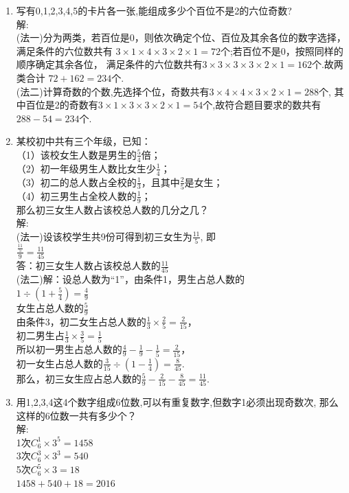 \documentclass[12pt,oneside,a4paper]{ctexbook} %
\numberwithin{chapter}{part}
\begin{document}
\begin{enumerate}
\item 
写有0,1,2,3,4,5的卡片各一张,能组成多少个百位不是2的六位奇数?\\
解:\\
(法一)分为两类，若百位是0，则依次确定个位、百位及其余各位的数字选择，满足条件的六位数共有
$3\times1\times4\times3\times2\times1=72$个;若百位不是0，按照同样的顺序确定其余各位，
满足条件的六位数共有$3\times3\times3\times3\times2\times1=162$个.故两类合计
$72+162=234$个.\\
(法二)计算奇数的个数,先选择个位，奇数共有$3\times4\times4\times3\times2\times1=288$个,
其中百位是2的奇数有$3\times1\times3\times3\times2\times1=54$个,故符合题目要求的数共有
$288-54=234$个.

\item 
某校初中共有三个年级，已知：\\
（1）该校女生人数是男生的$\frac{5}{4}$倍；\\
（2）初一年级男生人数比女生少$\frac{1}{4}$；\\
（3）初二的总人数占全校的$\frac{1}{3}$，且其中$\frac{2}{5}$是女生；\\
（4）初三男生占全校人数的$\frac{1}{9}$；\\
那么初三女生人数占该校总人数的几分之几？\\
解:\\
(法一)设该校学生共9份可得到初三女生为$\frac{11}{5}$, 即\\
$\frac{\frac{11}{5}}{9}=\frac{11}{45}$\\
答：初三女生人数占该校总人数的$\frac{11}{45}$\\
(法二)解：设总人数为“1”，由条件1，男生占总人数的\\
$1\div(1+\frac{5}{4})=\frac{4}{9}$\\
女生占总人数的$\frac{5}{9}$\\
由条件3，初二女生占总人数的$\frac{1}{3}\times\frac{2}{5}=\frac{2}{15}$，\\
初二男生占$\frac{1}{3}\times\frac{3}{5}=\frac{1}{5}$\\
所以初一男生占总人数的$\frac{4}{9}-\frac{1}{9}-\frac{1}{5}=\frac{2}{15}$，\\
初一女生占总人数的$\frac{3}{15}\div(1-\frac{1}{4})=\frac{8}{45}$.\\
那么，初三女生应占总人数的$\frac{5}{9}-\frac{2}{15}-\frac{8}{45}=\frac{11}{45}$.

\item 
用1,2,3,4这4个数字组成6位数,可以有重复数字,但数字1必须出现奇数次,
那么这样的6位数一共有多少个？\\
解:\\
1次$C_{6}^{1}\times3^5=1458$\\
3次$C_{6}^{3}\times3^3=540$\\
5次$C_{6}^{5}\times3=18$\\
$1458+540+18=2016$


\end{enumerate}
\end{document}
